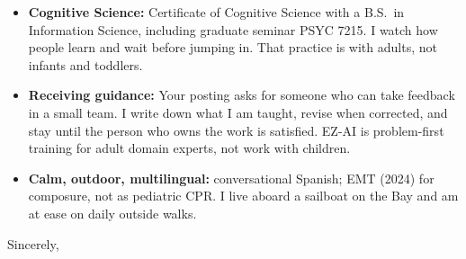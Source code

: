 \documentclass[]{cover}
\begin{document}
{\raggedright{}\fontsize{11pt}{13pt}\selectfont
\begin{itemize}
    \item \textbf{Cognitive Science:} Certificate of Cognitive Science with a B.S.\ in Information Science, including graduate seminar PSYC 7215. I watch how people learn and wait before jumping in. That practice is with adults, not infants and toddlers.
    \item \textbf{Receiving guidance:} Your posting asks for someone who can take feedback in a small team. I write down what I am taught, revise when corrected, and stay until the person who owns the work is satisfied. EZ-AI is problem-first training for adult domain experts, not work with children.
    \item \textbf{Calm, outdoor, multilingual:} conversational Spanish; EMT (2024) for composure, not as pediatric CPR. I live aboard a sailboat on the Bay and am at ease on daily outside walks.
\end{itemize}\par}
\vspace{6pt}



\begin{flushright}
\closing{Sincerely,}

\signature{Ethan Zaruba-Walker}
\end{flushright}
\end{document}
